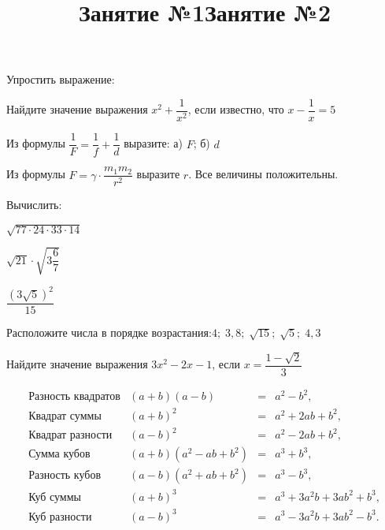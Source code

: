 \title{Занятие №1}
\begin{listofex}
	\item Упростить выражение:
	\begin{enumcols}[itemcolumns=2]
		\item {}
		\item {}
		\item {}
		\item {}
		\item {}
		\item {}
	\end{enumcols}
	\item {}
	\item {}
	\item Найдите значение выражения \( x^2+\dfrac{1}{x^2} \), если известно, что \( x-\dfrac{1}{x}=5 \)
	\item Из формулы \( \dfrac{1}{F}=\dfrac{1}{f}+\dfrac{1}{d} \) выразите: а) \( F \); б) \( d \)
	\item Из формулы \( F=\gamma\cdot\dfrac{m_1m_2}{r^2} \) выразите \( r \). Все величины положительны.
	\item Вычислить:
	\begin{enumcols}[itemcolumns=3]
		\item \( \sqrt{77\cdot24\cdot33\cdot14} \)
		\item \( \sqrt{21}\cdot\sqrt{3\dfrac{6}{7}} \)
		\item \( \dfrac{(3\sqrt{5})^2}{15} \)
	\end{enumcols}
	\item Расположите числа в порядке возрастания:\quad\( 4;\;3,8;\;\sqrt{15};\;\sqrt{5};\;4,3 \)
	\item Найдите значение выражения \( 3x^2-2x-1 \), если \( x=\dfrac{1-\sqrt{2}}{3} \)
	
\end{listofex}
\newpage
\title{Занятие №2}
\[ \begin{array}{cccc}
	\text{Разность квадратов}&(a+b)(a-b)& =&a^2-b^2,\\
	\text{Квадрат суммы}&(a+b)^2& =&a^2+2ab+b^2,\\
	\text{Квадрат разности}&(a-b)^2& =&a^2-2ab+b^2,\\
	\text{Сумма кубов}&(a+b)(a^2-ab+b^2)& =&a^3+b^3,\\
	\text{Разность кубов}&(a-b)(a^2+ab+b^2)& =&a^3-b^3,\\
	\text{Куб суммы}&(a+b)^3& =&a^3+3a^2b+3ab^2+b^3,\\
	\text{Куб разности}&(a-b)^3& =&a^3-3a^2b+3ab^2-b^3.\\
\end{array} \]
